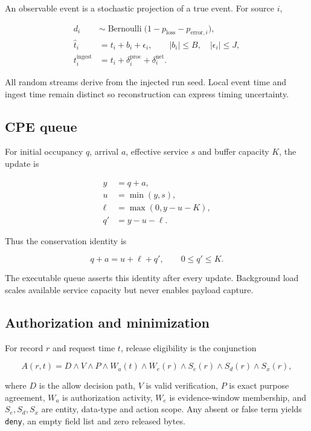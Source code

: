 ﻿\documentclass[11pt,a4paper]{article}
\newcommand{\code}[1]{\texttt{#1}}
\begin{document}
An observable event is a stochastic projection of a true event. For source $i$,

\begin{align}
d_i &\sim \operatorname{Bernoulli}\bigl(1-p_{\mathrm{loss}}-p_{\mathrm{error},i}\bigr),\\
\hat{t}_i &= t_i+b_i+\epsilon_i,\qquad |b_i|\leq B,\quad |\epsilon_i|\leq J,\\
t_i^{\mathrm{ingest}} &= t_i+\delta_i^{\mathrm{proc}}+\delta_i^{\mathrm{net}}.
\end{align}

All random streams derive from the injected run seed. Local event time and ingest time remain distinct so reconstruction can express timing uncertainty.

\subsection{CPE queue}

For initial occupancy $q$, arrival $a$, effective service $s$ and buffer capacity $K$, the update is

\begin{align}
y &= q+a,\\
u &= \min(y,s),\\
\ell &= \max(0,y-u-K),\\
q' &= y-u-\ell.
\end{align}

Thus the conservation identity is

\begin{equation}
q+a=u+\ell+q',\qquad 0\leq q'\leq K.
\end{equation}

The executable queue asserts this identity after every update. Background load scales available service capacity but never enables payload capture.

\subsection{Authorization and minimization}

For record $r$ and request time $t$, release eligibility is the conjunction

\begin{equation}
A(r,t)=D\land V\land P\land W_a(t)\land W_e(r)\land S_e(r)\land S_d(r)\land S_x(r),
\end{equation}

where $D$ is the allow decision path, $V$ is valid verification, $P$ is exact purpose agreement, $W_a$ is authorization activity, $W_e$ is evidence-window membership, and $S_e,S_d,S_x$ are entity, data-type and action scope. Any absent or false term yields \code{deny}, an empty field list and zero released bytes.
\end{document}
